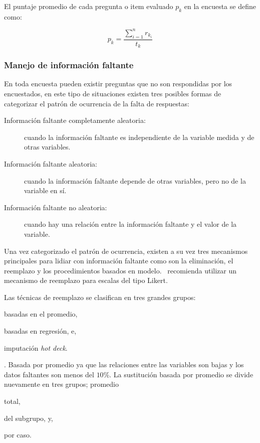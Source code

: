 El puntaje promedio de cada pregunta o item evaluado  $p_k$ en la encuesta se
define como:

\begin{equation}
p_k = \frac{\sum_{i=1}^n{r_{k_i}}}{t_k}
\end{equation}

\subsubsection{Manejo de información faltante}
\label{sec:informacion_faltante}

En toda encuesta pueden existir preguntas que no son respondidas por los encuestados, 
en este tipo de situaciones existen tres posibles formas de categorizar el 
patrón de ocurrencia de la falta de 
respuestas\cite{leite2010performance,tsikriktsis2005review}:

\begin{description}
    \item[Información faltante completamente aleatoria:] cuando la información
        faltante es independiente de la variable medida y de otras variables.
    \item[Información faltante aleatoria:] cuando la información faltante depende
        de otras variables, pero no de la variable en sí. 
    \item[Información faltante no aleatoria:] cuando hay una relación entre la
        información faltante y el valor de la variable.
\end{description}

Una vez categorizado el patrón de ocurrencia, existen a su vez tres
mecanismos~\cite{tsikriktsis2005review} principales para lidiar con información
faltante como son la eliminación, el reemplazo y los  procedimientos basados en
modelo.~\cite{tsikriktsis2005review} recomienda utilizar un mecanismo de
reemplazo para escalas del tipo Likert.

Las técnicas de reemplazo se clasifican en tres grandes
grupos\cite{tsikriktsis2005review}:
\begin{enumerate*}[label=\itshape\alph*\upshape)]
\item basadas en el promedio,
\item basadas en regresión, e,
\item imputación \emph{hot deck}.
\end{enumerate*}

. Basada por
promedio ya que las relaciones entre las variables son bajas y los datos
faltantes son menos del $10\%$. La sustitución basada por promedio se divide
nuevamente en tres grupos\cite{tsikriktsis2005review}; promedio
\begin{enumerate*}[label=\itshape\alph*\upshape.]
\item total,
\item del subgrupo, y,
\item por caso.
\end{enumerate*}

